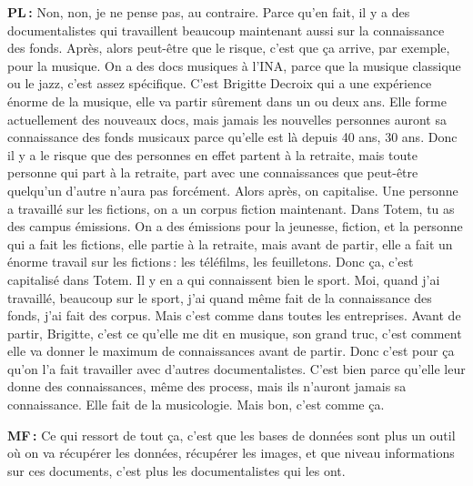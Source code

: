 \textbf{PL :} Non, non, je ne pense pas, au contraire. Parce qu'en fait, il y a des documentalistes qui travaillent beaucoup maintenant aussi sur la connaissance des fonds. Après, alors peut-être que le risque, c'est que ça arrive, par exemple, pour la musique. On a des docs musiques à l’INA, parce que la musique classique ou le jazz, c'est assez spécifique. C'est Brigitte Decroix qui a une expérience énorme de la musique, elle va partir sûrement dans un ou deux ans. Elle forme actuellement des nouveaux docs, mais jamais les nouvelles personnes auront sa connaissance des fonds musicaux parce qu'elle est là depuis 40 ans, 30 ans. Donc il y a le risque que des personnes en effet partent à la retraite, mais toute personne qui part à la retraite, part avec une connaissances que peut-être quelqu'un d'autre n'aura pas forcément. Alors après, on capitalise. Une personne a travaillé sur les fictions, on a un corpus fiction maintenant. Dans Totem, tu as des campus émissions. On a des émissions pour la jeunesse, fiction, et la personne qui a fait les fictions, elle partie à la retraite, mais avant de partir, elle a fait un énorme travail sur les fictions : les téléfilms, les feuilletons. Donc ça, c'est capitalisé dans Totem. Il y en a qui connaissent bien le sport.  Moi, quand j'ai travaillé, beaucoup sur le sport, j'ai quand même fait de la connaissance des fonds, j'ai fait des corpus. Mais c'est comme dans toutes les entreprises.  Avant de partir, Brigitte, c'est ce qu’elle me dit en musique, son grand truc, c'est comment elle va donner le maximum de connaissances avant de partir. Donc c'est pour ça qu'on l'a fait travailler avec d'autres documentalistes. C'est bien parce qu'elle leur donne des connaissances, même des process, mais ils n'auront jamais sa connaissance. Elle fait de la musicologie. Mais bon, c'est comme ça. 

\textbf{MF :} Ce qui ressort de tout ça, c'est que les bases de données sont plus un outil où on va récupérer les données, récupérer les images, et que niveau informations sur ces documents, c'est plus les documentalistes qui les ont.   


